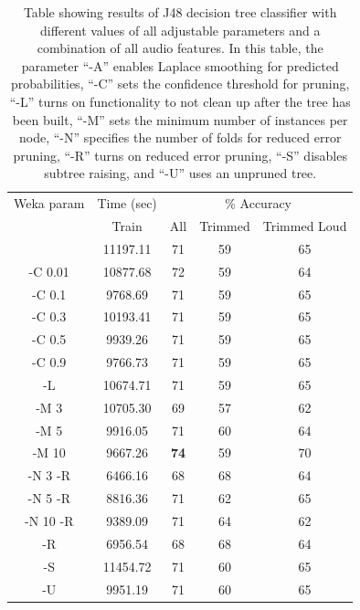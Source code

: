 \begin{table}
\begin{tabular}{|c|c|c|c|c|}
\hline
\multicolumn{1}{|c|}{Weka param} & \multicolumn{1}{c|}{Time (sec)} & \multicolumn{3}{c|}{\% Accuracy} \\
\hhline{|-|-|-|-|-|}
  & Train & All & Trimmed & Trimmed Loud \\
\hhline{|=|=|=|=|=|}
           &    11197.11  &    71  & 59 & 65 \\
 -C 0.01   &    10877.68  &    72  & 59 & 64 \\
 -C 0.1    &     9768.69  &    71  & 59 & 65 \\
 -C 0.3    &    10193.41  &    71  & 59 & 65 \\
 -C 0.5    &     9939.26  &    71  & 59 & 65 \\
 -C 0.9    &     9766.73  &    71  & 59 & 65 \\
\hline
 -L        &    10674.71  &    71  & 59 & 65 \\
 -M 3      &    10705.30  &    69  & 57 & 62 \\
 -M 5      &     9916.05  &    71  & 60 & 64 \\
 -M 10     &     9667.26  &    \textbf{74}  & 59 & 70 \\
 -N 3 -R   &     6466.16  &    68  & 68 & 64 \\
 -N 5 -R   &     8816.36  &    71  & 62 & 65 \\
 -N 10 -R  &     9389.09  &    71  & 64 & 62 \\
\hline
 -R        &     6956.54  &    68  & 68 & 64 \\
 -S        &    11454.72  &    71  & 60 & 65 \\
 -U        &     9951.19  &    71  & 60 & 65\\
\hline
\end{tabular}
\caption{Table showing results of J48 decision
  tree classifier with different values of all adjustable parameters
  and a combination of all audio features.  In this table, the
  parameter ``-A'' enables Laplace smoothing for predicted
  probabilities, ``-C'' sets the confidence threshold for pruning,
  ``-L'' turns on functionality to not clean up after the tree has
  been built, ``-M'' sets the minimum number of instances per node,
  ``-N'' specifies the number of folds for reduced error pruning,
  ``-R'' turns on reduced error pruning, ``-S'' disables subtree
  raising, and ``-U'' uses an unpruned tree.}
\label{table:calls-weka-j48}
\end{table}

